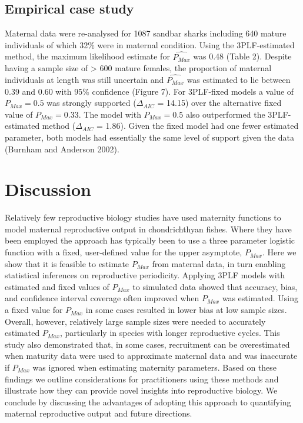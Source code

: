 \documentclass[
]{article}
\begin{document}
\subsection{Empirical case study}\label{empirical-case-study-1}

Maternal data were re-analysed for 1087 sandbar sharks including 640 mature individuals of which 32\% were in maternal condition. Using the 3PLF-estimated method, the maximum likelihood estimate for \(\hat{P_{Max}}\) was 0.48 (Table 2). Despite having a sample size of \textgreater{} 600 mature females, the proportion of maternal individuals at length was still uncertain and \(\hat{P_{Max}}\) was estimated to lie between 0.39 and 0.60 with 95\% confidence (Figure 7). For 3PLF-fixed models a value of \(P_{Max} = 0.5\) was strongly supported (\(\Delta_{AIC}\) = 14.15) over the alternative fixed value of \(P_{Max} = 0.33\). The model with \(P_{Max} = 0.5\) also outperformed the 3PLF-estimated method (\(\Delta_{AIC}\) = 1.86). Given the fixed model had one fewer estimated parameter, both models had essentially the same level of support given the data (Burnham and Anderson 2002).

\section{Discussion}\label{discussion}

Relatively few reproductive biology studies have used maternity functions to model maternal reproductive output in chondrichthyan fishes. Where they have been employed the approach has typically been to use a three parameter logistic function with a fixed, user-defined value for the upper asymptote, \(P_{Max}\). Here we show that it is feasible to estimate \(P_{Max}\) from maternal data, in turn enabling statistical inferences on reproductive periodicity. Applying 3PLF models with estimated and fixed values of \(P_{Max}\) to simulated data showed that accuracy, bias, and confidence interval coverage often improved when \(P_{Max}\) was estimated. Using a fixed value for \(P_{Max}\) in some cases resulted in lower bias at low sample sizes. Overall, however, relatively large sample sizes were needed to accurately estimated \(P_{Max}\), particularly in species with longer reproductive cycles. This study also demonstrated that, in some cases, recruitment can be overestimated when maturity data were used to approximate maternal data and was inaccurate if \(P_{Max}\) was ignored when estimating maternity parameters. Based on these findings we outline considerations for practitioners using these methods and illustrate how they can provide novel insights into reproductive biology. We conclude by discussing the advantages of adopting this approach to quantifying maternal reproductive output and future directions.
\end{document}
